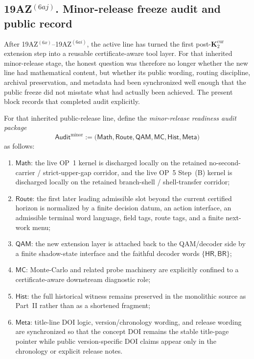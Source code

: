 \subsection*{19AZ$^{(6aj)}$. Minor-release freeze audit and public record}
\label{sec:minor-release-preparation-audit-and-freeze-checklist}
After 19AZ$^{(6x)}$--19AZ$^{(6ai)}$, the active line has turned the first post-\(\mathbf K_2^{\mathrm{cur}}\) extension step into a reusable certificate-aware tool layer. For that inherited minor-release stage, the honest question was therefore no longer whether the new line had mathematical content, but whether its public wording, routing discipline, archival preservation, and metadata had been synchronized well enough that the public freeze did not misstate what had actually been achieved. The present block records that completed audit explicitly.

\begin{definition}
\label{def:minor-release-readiness-audit-package}
For that inherited public-release line, define the \emph{minor-release readiness audit package}
\[
 \mathsf{Audit}^{\mathrm{minor}}
 :=
 \bigl(\mathsf{Math},\mathsf{Route},\mathsf{QAM},\mathsf{MC},\mathsf{Hist},\mathsf{Meta}\bigr)
\]
as follows:
\begin{enumerate}[label=(\roman*)]
 \item \(\mathsf{Math}\): the live OP~1 kernel is discharged locally on the retained no-second-carrier / strict-upper-gap corridor, and the live OP~5 Step~(B) kernel is discharged locally on the retained branch-shell / shell-transfer corridor;
 \item \(\mathsf{Route}\): the first later leading admissible slot beyond the current certified horizon is normalized by a finite decision datum, an action interface, an admissible terminal word language, field tags, route tags, and a finite next-work menu;
 \item \(\mathsf{QAM}\): the new extension layer is attached back to the QAM/decoder side by a finite shadow-state interface and the faithful decoder words \(\{\mathsf{HR},\mathsf{BR}\}\);
 \item \(\mathsf{MC}\): Monte-Carlo and related probe machinery are explicitly confined to a certificate-aware downstream diagnostic role;
 \item \(\mathsf{Hist}\): the full historical witness remains preserved in the monolithic source as Part~II rather than as a shortened fragment;
 \item \(\mathsf{Meta}\): title-line DOI logic, version/chronology wording, and release wording are synchronized so that the concept DOI remains the stable title-page pointer while public version-specific DOI claims appear only in the chronology or explicit release notes.
\end{enumerate}
\end{definition}

